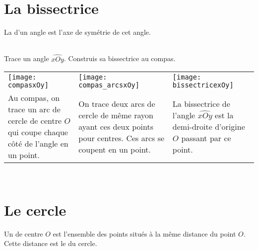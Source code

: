 
\section{La bissectrice}

\begin{aconnaitre}
La \textbf{} d'un angle est l'axe de symétrie de cet angle.
\end{aconnaitre}


\begin{methode*1}


\begin{exemple*1} \\[0.75em]
Trace un angle $\widehat{xOy}$. Construis sa bissectrice au compas. \\[0.5em]

\begin{tabularx}{\textwidth}{X|X|X}
 \texttt{[image: compasxOy]} &  \texttt{[image: compas\_arcsxOy]} & \texttt{[image: bissectricexOy]} \\ 
Au compas, on trace un arc de cercle de centre $O$ qui coupe chaque côté de l'angle en un point. & On trace deux arcs de cercle de même rayon ayant ces deux points pour centres. Ces arcs se coupent en un point. & La bissectrice de l'angle $\widehat{xOy}$ est la demi-droite d'origine $O$ passant par ce point. \\
\end{tabularx} \\

 \end{exemple*1}

\exercice %



 
\end{methode*1}


\section{Le cercle}

\begin{definition}
Un \textbf{} de centre $O$ est l'ensemble des points situés à la même distance du point $O$. 
Cette distance est le \textbf{} du cercle.
\end{definition}

